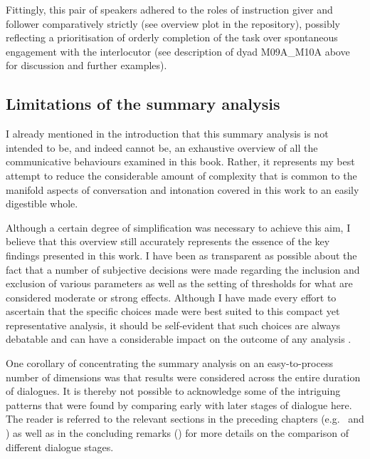 Fittingly, this pair of speakers adhered to the roles of instruction giver and follower comparatively strictly (see overview plot in the repository), possibly reflecting a prioritisation of orderly completion of the task over spontaneous engagement with the interlocutor (see description of dyad M09A\_M10A above for discussion and further examples).


\subsection{Limitations of the summary analysis}\label{Conclusion_SummaryAnalysis_limitations}

I already mentioned in the introduction that this summary analysis is not intended to be, and indeed cannot be, an exhaustive overview of all the communicative behaviours examined in this book. Rather, it represents my best attempt to reduce the considerable amount of complexity that is common to the manifold aspects of conversation and intonation covered in this work to an easily digestible whole.

Although a certain degree of simplification was necessary to achieve this aim, I believe that this overview still accurately represents the essence of the key findings presented in this work. I have been as transparent as possible about the fact that a number of subjective decisions were made regarding the inclusion and exclusion of various parameters as well as the setting of thresholds for what are considered moderate or strong effects. Although I have made every effort to ascertain that the specific choices made were best suited to this compact yet representative analysis, it should be self-evident that such choices are always debatable and can have a considerable impact on the outcome of any analysis \citep{corettaMultidimensionalSignalsAnalytic2023,roettgerResearcherDegreesFreedom2019}.

One corollary of concentrating the summary analysis on an easy-to-process number of dimensions was that results were considered across the entire duration of dialogues. It is thereby not possible to acknowledge some of the intriguing patterns that were found by comparing early with later stages of dialogue here. The reader is referred to the relevant sections in the preceding chapters (e.g.~ and ) as well as in the concluding remarks () for more details on the comparison of different dialogue stages.

